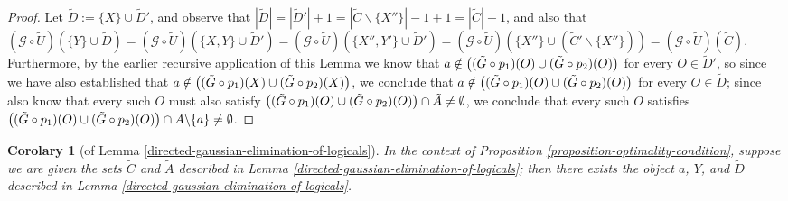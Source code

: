 \documentclass[twocolumn,showpacs,preprintnumbers,amsmath,amssymb,nofootinbib,pra,floatfix]{revtex4-1}
\newtheorem{corolary}{Corolary}
\newcommand{\set}{\tilde}
\newcommand{\genfun}{\mathcal{G}}
\begin{document}
\begin{proof}
Let $\set D:=\{X\}\cup\set D'$, and observe that $|\set D|=|\set D'|+1=|\set C\backslash \{X''\}|-1+1=|\set C|-1$, and also that $(\genfun\circ\set U)(\{Y\}\cup\set D)=(\genfun\circ\set U)(\{X,Y\}\cup\set D')=(\genfun\circ\set U)(\{X'',Y'\}\cup\set D')=(\genfun\circ\set U)(\{X''\}\cup(\set C'\backslash\{X''\}))=(\genfun\circ\set U)(\set C)$.  Furthermore, by the earlier recursive application of this Lemma we know that $a\notin\paren{(\set G\circ p_1)(O) \cup (\set G\circ p_2)(O)}$ for every $O\in \set D'$, so since we have also established that $a\notin \paren{(\set G \circ p_1)(X) \cup (\set G \circ p_2)(X)}$, we conclude that $a\notin\paren{(\set G\circ p_1)(O) \cup (\set G\circ p_2)(O)}$ for every $O\in \set D$;  since also know that every such $O$ must also satisfy $\paren{(\set G\circ p_1)(O) \cup (\set G\circ p_2)(O)}\cap \set A \ne \emptyset$, we conclude that every such $O$ satisfies $\paren{(\set G\circ p_1)(O) \cup (\set G\circ p_2)(O)} \cap A\backslash\{a\}\ne\emptyset$.
\end{proof}
\begin{corolary}[of Lemma \ref{directed-gaussian-elimination-of-logicals}]
\label{undirected-gaussian-elimination-of-logicals}
In the context of Proposition \ref{proposition-optimality-condition}, suppose we are given the sets $\set C$ and $\set A$ described in Lemma \ref{directed-gaussian-elimination-of-logicals};  then there exists the object $a$, $Y$, and $\set D$ described in Lemma \ref{directed-gaussian-elimination-of-logicals}.
\end{corolary}
\end{document}
